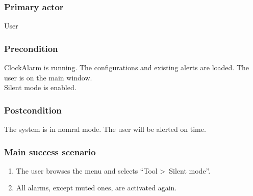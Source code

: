 \subsubsection{Primary actor}
User
\subsubsection{Precondition}
ClockAlarm is running. The configurations and existing alerts are loaded. The user is on the main window.
\\Silent mode is enabled.
\subsubsection{Postcondition}
The system is in nomral mode. The user will be alerted on time.
\subsubsection{Main success scenario}
\begin{enumerate}
	\item The user browses the menu and selects ``Tool \textgreater~Silent mode''.
	\item All alarms, except muted ones, are activated again.
\end{enumerate}